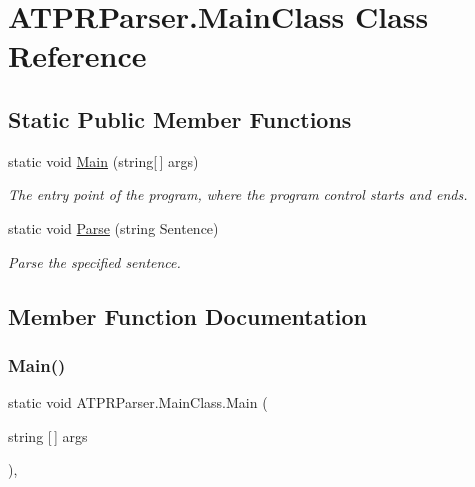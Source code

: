 \hypertarget{class_a_t_p_r_parser_1_1_main_class}{}\section{A\+T\+P\+R\+Parser.\+Main\+Class Class Reference}
\label{class_a_t_p_r_parser_1_1_main_class}
\subsection*{Static Public Member Functions}
\begin{DoxyCompactItemize}
\item 
static void \hyperlink{class_a_t_p_r_parser_1_1_main_class_ade65079470bbddf6148ad515cb75e389}{Main} (string\mbox{[}$\,$\mbox{]} args)
\begin{DoxyCompactList}\small\item\em The entry point of the program, where the program control starts and ends. \end{DoxyCompactList}\item 
static void \hyperlink{class_a_t_p_r_parser_1_1_main_class_a1c0e43fd38d99a01c9b9ead51d2da1e5}{Parse} (string Sentence)
\begin{DoxyCompactList}\small\item\em Parse the specified sentence. \end{DoxyCompactList}\end{DoxyCompactItemize}


\subsection{Member Function Documentation}
\hypertarget{class_a_t_p_r_parser_1_1_main_class_ade65079470bbddf6148ad515cb75e389}{}\label{class_a_t_p_r_parser_1_1_main_class_ade65079470bbddf6148ad515cb75e389} 
\subsubsection{\texorpdfstring{Main()}{Main()}}
{\footnotesize\ttfamily static void A\+T\+P\+R\+Parser.\+Main\+Class.\+Main (\begin{DoxyParamCaption}\item[{string \mbox{[}$\,$\mbox{]}}]{args }\end{DoxyParamCaption})\hspace{0.3cm}{\ttfamily [inline]}, {\ttfamily [static]}}




